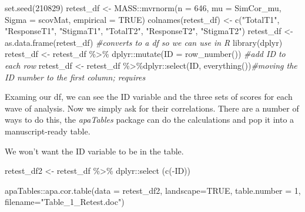 \documentclass[
  english,
]{book}
\newenvironment{Shaded}{\begin{snugshade}}{\end{snugshade}}
\newcommand{\AttributeTok}[1]{\textcolor[rgb]{0.77,0.63,0.00}{#1}}
\newcommand{\CommentTok}[1]{\textcolor[rgb]{0.56,0.35,0.01}{\textit{#1}}}
\newcommand{\ConstantTok}[1]{\textcolor[rgb]{0.00,0.00,0.00}{#1}}
\newcommand{\DecValTok}[1]{\textcolor[rgb]{0.00,0.00,0.81}{#1}}
\newcommand{\FunctionTok}[1]{\textcolor[rgb]{0.00,0.00,0.00}{#1}}
\newcommand{\NormalTok}[1]{#1}
\newcommand{\OtherTok}[1]{\textcolor[rgb]{0.56,0.35,0.01}{#1}}
\newcommand{\SpecialCharTok}[1]{\textcolor[rgb]{0.00,0.00,0.00}{#1}}
\newcommand{\StringTok}[1]{\textcolor[rgb]{0.31,0.60,0.02}{#1}}
\begin{document}
\begin{Shaded}
\begin{Highlighting}[]
\FunctionTok{set.seed}\NormalTok{(}\DecValTok{210829}\NormalTok{)}
\NormalTok{retest\_df }\OtherTok{\textless{}{-}}\NormalTok{ MASS}\SpecialCharTok{::}\FunctionTok{mvrnorm}\NormalTok{(}\AttributeTok{n =} \DecValTok{646}\NormalTok{, }\AttributeTok{mu =}\NormalTok{ SimCor\_mu, }\AttributeTok{Sigma =}\NormalTok{ scovMat, }\AttributeTok{empirical =} \ConstantTok{TRUE}\NormalTok{)}
\FunctionTok{colnames}\NormalTok{(retest\_df) }\OtherTok{\textless{}{-}} \FunctionTok{c}\NormalTok{(}\StringTok{"TotalT1"}\NormalTok{, }\StringTok{"ResponseT1"}\NormalTok{, }\StringTok{"StigmaT1"}\NormalTok{, }\StringTok{"TotalT2"}\NormalTok{, }\StringTok{"ResponseT2"}\NormalTok{, }\StringTok{"StigmaT2"}\NormalTok{)}
\NormalTok{retest\_df  }\OtherTok{\textless{}{-}} \FunctionTok{as.data.frame}\NormalTok{(retest\_df) }\CommentTok{\#converts to a df so we can use in R}
\FunctionTok{library}\NormalTok{(dplyr)}
\NormalTok{retest\_df }\OtherTok{\textless{}{-}}\NormalTok{ retest\_df }\SpecialCharTok{\%\textgreater{}\%}\NormalTok{ dplyr}\SpecialCharTok{::}\FunctionTok{mutate}\NormalTok{(}\AttributeTok{ID =} \FunctionTok{row\_number}\NormalTok{()) }\CommentTok{\#add ID to each row}
\NormalTok{retest\_df }\OtherTok{\textless{}{-}}\NormalTok{ retest\_df }\SpecialCharTok{\%\textgreater{}\%}\NormalTok{dplyr}\SpecialCharTok{::}\FunctionTok{select}\NormalTok{(ID, }\FunctionTok{everything}\NormalTok{())}\CommentTok{\#moving the ID number to the first column; requires}
\end{Highlighting}
\end{Shaded}

Examing our df, we can see the ID variable and the three sets of scores for each wave of analysis. Now we simply ask for their correlations. There are a number of ways to do this, the \emph{apaTables} package can do the calculations and pop it into a manuscript-ready table.

We won't want the ID variable to be in the table.

\begin{Shaded}
\begin{Highlighting}[]
\NormalTok{retest\_df2 }\OtherTok{\textless{}{-}}\NormalTok{ retest\_df }\SpecialCharTok{\%\textgreater{}\%}
\NormalTok{  dplyr}\SpecialCharTok{::}\FunctionTok{select}\NormalTok{ (}\FunctionTok{c}\NormalTok{(}\SpecialCharTok{{-}}\NormalTok{ID))}
\end{Highlighting}
\end{Shaded}

\begin{Shaded}
\begin{Highlighting}[]
\NormalTok{apaTables}\SpecialCharTok{::}\FunctionTok{apa.cor.table}\NormalTok{(}\AttributeTok{data =}\NormalTok{ retest\_df2, }\AttributeTok{landscape=}\ConstantTok{TRUE}\NormalTok{, }\AttributeTok{table.number =} \DecValTok{1}\NormalTok{, }\AttributeTok{filename=}\StringTok{"Table\_1\_Retest.doc"}\NormalTok{)}
\end{Highlighting}
\end{Shaded}
\end{document}
